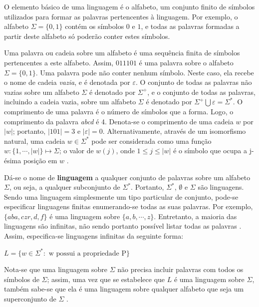 \documentclass[12pt,a4paper]{article}
\begin{document}
O elemento básico de uma linguagem é o alfabeto, um conjunto finito de símbolos
utilizados para formar as palavras pertencentes à linguagem. Por exemplo, o
alfabeto $\Sigma = \{0,1\}$ contém os símbolos $0$ e $1$, e todas as palavras
formadas a partir deste alfabeto só poderão conter estes símbolos.

Uma palavra ou cadeia sobre um alfabeto é uma sequência finita de símbolos
pertencentes a este alfabeto. Assim, $011101$ é uma palavra sobre o alfabeto
$\Sigma = \{0, 1\}$. Uma palavra pode não conter nenhum símbolo. Neste caso,
ela recebe o nome de cadeia \textit{vazia}, e é denotada por $\varepsilon$.
O conjunto de todas as palavras não vazias sobre um alfabeto $\Sigma$ é
denotado por $\Sigma^+$, e o conjunto de todas as palavras, incluindo
a cadeia vazia, sobre um alfabeto $\Sigma$ é denotado por
${\Sigma}^+ \bigcup \varepsilon = \Sigma^*$. O comprimento de uma palavra
é o número de símbolos que a forma. Logo, o comprimento da palavra
\emph{abcd} é 4. Denota-se o comprimento de uma cadeia $w$ por
$|w|$; portanto, $|101| = 3$ e $|\varepsilon| = 0$. Alternativamente,
através de um isomorfismo natural, uma cadeia $w \in \Sigma^*$ pode ser
considerada como uma função $w: \{1,\cdots,|w|\} \mapsto \Sigma$; o
valor de $w(j)$, onde $1 \le j \le |w|$ é o símbolo que ocupa a j-ésima
posição em $w$ .

Dá-se o nome de \textbf{linguagem} a qualquer conjunto de palavras sobre um
alfabeto $\Sigma$, ou seja, a qualquer subconjunto de $\Sigma^*$. Portanto,
$\Sigma^*$, $\emptyset$ e $\Sigma$ são linguagens. Sendo uma linguagem 
simplesmente um tipo particular de conjunto, pode-se especificar linguagens
finitas enumerando-se todas as suas palavras. Por exemplo, $\{aba, czr, d, f\}$
é uma linguagem sobre $\{a, b, \cdots, z\}$. Entretanto, a maioria das
linguagens são infinitas, não sendo portanto possível listar todas as palavras
. Assim, especifica-se linguagens infinitas da seguinte forma:

\begin{center}
$L = \{w \in \Sigma^*: \mbox{ w possui a propriedade P}\}$
\end{center}

Nota-se que uma linguagem sobre $\Sigma$ não precisa incluir palavras com todos
os símbolos de $\Sigma$; assim, uma vez que se estabelece que $L$ é uma
linguagem sobre $\Sigma$, também sabe-se que ela é uma linguagem sobre qualquer
alfabeto que seja um superconjunto de $\Sigma$ .
\end{document}
